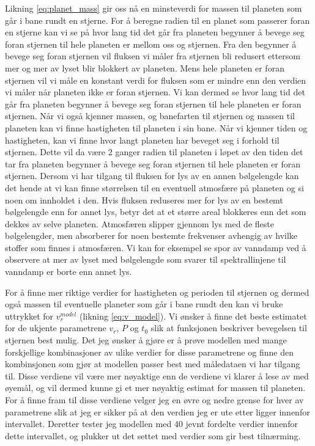\documentclass[english,notitlepage]{revtex4-1}  %
\begin{document}
Likning \ref{eq:planet_mass} gir oss nå en minsteverdi for massen til planeten som går i
 bane rundt en stjerne. For å beregne radien til en planet som passerer foran en stjerne kan vi se på hvor lang tid det går fra planeten begynner å bevege seg foran stjernen til hele planeten er mellom oss og stjernen. Fra den begynner å bevege seg foran stjernen vil fluksen vi måler fra stjernen bli redusert ettersom mer og mer av lyset blir blokkert av planeten. Mens hele planeten er foran stjernen vil vi måle en konstant verdi for fluksen som er mindre enn den verdien vi måler når planeten ikke er foran stjernen. Vi kan dermed se hvor lang tid det går fra planeten begynner å bevege seg foran stjernen til hele planeten er foran stjernen. Når vi også kjenner massen, og banefarten til stjernen og massen til planeten kan vi finne hastigheten til planeten i sin bane. Når vi kjenner tiden og hastigheten, kan vi finne hvor langt planeten har beveget seg i forhold til stjernen. Dette vil da være 2 ganger radien til planeten i løpet av den tiden det tar fra planeten begynner å bevege seg foran stjernen til hele planeten er foran stjernen. Dersom vi har tilgang til fluksen for lys av en annen bølgelengde kan det hende at vi kan finne størrelsen til en eventuell atmosfære på planeten og si noen om innholdet i den. Hvis fluksen reduseres mer for lys av en bestemt bølgelengde enn for annet lys, betyr det at et større areal blokkeres enn det som dekkes av selve planeten. Atmosfæren slipper gjennom lys med de fleste bølgelengder, men absorberer for noen bestemte frekvenser avhengig av hvilke stoffer som finnes i atmosfæren. Vi kan for eksempel se spor av vanndamp ved å observere at mer av lyset med bølgelengde som svarer til spektrallinjene til vanndamp er borte enn annet lys.

For å finne mer riktige verdier for hastigheten og perioden til stjernen og dermed også
 massen til eventuelle planeter som går i bane rundt den kan vi bruke uttrykket for $v_r^{model}$ (likning \ref{eq:v_model}). Vi ønsker å finne det beste estimatet for de ukjente parametrene $v_r$, $P$ og $t_0$ slik at funksjonen beskriver bevegelsen til stjernen best mulig. Det jeg ønsker å gjøre er å prøve modellen med mange forskjellige kombinasjoner av ulike verdier for disse parametrene og finne den kombinsjonen som gjør at modellen passer best med måledataen vi har tilgang til. Disse verdiene vil være mer nøyaktige enn de verdiene vi klarer å lese av med øyemål, og vil dermed kunne gi et mer nøyaktig estimat for massen til planeten. For å finne fram til disse verdiene velger jeg en øvre og nedre grense for hver av parametrene slik at jeg er sikker på at den verdien jeg er ute etter ligger innenfor intervallet. Deretter tester jeg modellen med 40 jevnt fordelte verdier innenfor dette intervallet, og plukker ut det settet med verdier som gir best tilnærming.
\end{document}
